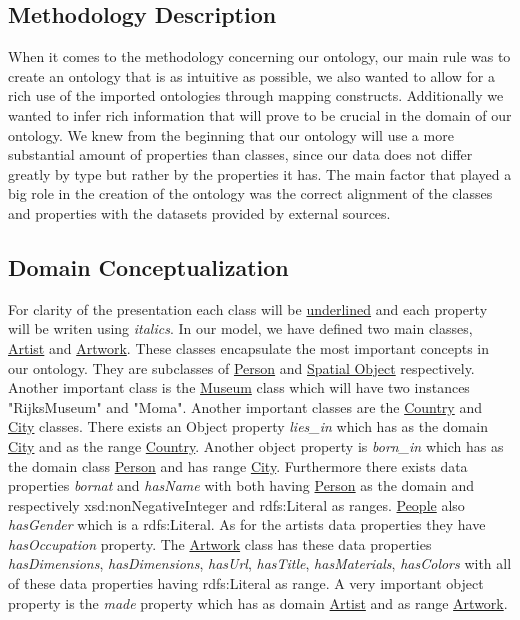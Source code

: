 \documentclass{article}
\begin{document}
\subsection{Methodology Description}


When it comes to the methodology concerning our ontology, our main rule was to create an
ontology that is as intuitive as possible, we also wanted to allow for a rich use of the imported
ontologies through mapping constructs. Additionally we wanted to infer rich information that will prove
to be crucial in the domain of our ontology. We knew from the beginning that our ontology will
use a more substantial amount of properties than classes, since our data does not differ greatly by
type but rather by the properties it has. The main factor that played a big role in the
creation of the ontology was the correct alignment of the classes and properties with the datasets
provided by external sources.

\subsection{Domain Conceptualization}
For clarity of the presentation each class will be \underline{underlined} and each property will be writen using \textit{italics}. 
In our model, we have defined two main classes,  \underline{Artist} and \underline{Artwork}. These classes encapsulate the most important concepts in our ontology. They are subclasses of \underline{Person} and \underline{Spatial Object} respectively. 
Another important class is the \underline{Museum} class which will have two instances "RijksMuseum" and "Moma". Another important classes are the \underline{Country} and \underline{City} classes.  There exists an Object property \textit{lies\_in} which has as the domain \underline{City} and as the range \underline{Country}. Another object property is  \textit{born\_in} which has as the domain class \underline{Person} and has range \underline{City}. Furthermore there exists data properties  \textit{bornat}     and \textit{hasName} with both having \underline{Person} as the domain and respectively xsd:nonNegativeInteger and rdfs:Literal as ranges.
\underline{People} also \textit{hasGender} which is a rdfs:Literal. As for the artists data properties they have \textit{hasOccupation} property. The \underline{Artwork} class has these data properties \textit{hasDimensions}, \textit{hasDimensions}, \textit{hasUrl}, \textit{hasTitle}, \textit{hasMaterials}, \textit{hasColors} with all of these data properties having rdfs:Literal as range. A very important object property is the \textit{made} property which has as domain \underline{Artist} and as range \underline{Artwork}. 
\end{document}
